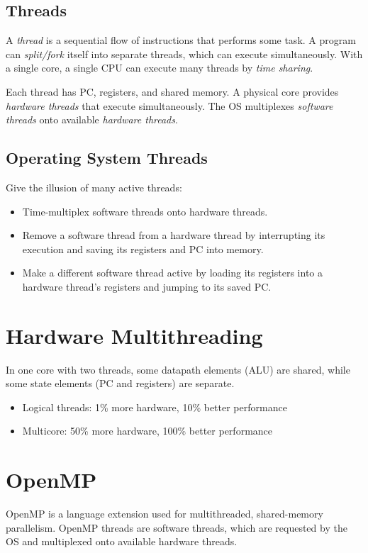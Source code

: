 \subsection{Threads}
A \emph{thread} is a sequential flow of instructions that performs some task. A program can \emph{split/fork} itself into separate threads, which can execute simultaneously. With a single core, a single CPU can execute many threads by \emph{time sharing}.

\medskip

Each thread has PC, registers, and shared memory. A physical core provides \emph{hardware threads} that execute simultaneously. The OS multiplexes \emph{software threads} onto available \emph{hardware threads}.

\subsection{Operating System Threads}
Give the illusion of many active threads:
\begin{itemize}
    \item  Time-multiplex software threads onto hardware threads.
    \item Remove a software thread from a hardware thread by interrupting its execution and saving its registers and PC into memory.
    \item Make a different software thread active by loading its registers into a hardware thread’s registers and jumping to its saved PC.
\end{itemize}

\section{Hardware Multithreading}
In one core with two threads, some datapath elements (ALU) are shared, while some state elements (PC and registers) are separate.

\begin{itemize}
	\item Logical threads: 1\% more hardware, 10\% better performance
	\item Multicore: 50\% more hardware, 100\% better performance
\end{itemize}

\section{OpenMP}
OpenMP is a language extension used for multithreaded, shared-memory parallelism. OpenMP threads are software threads, which are requested by the OS and multiplexed onto available hardware threads. 


